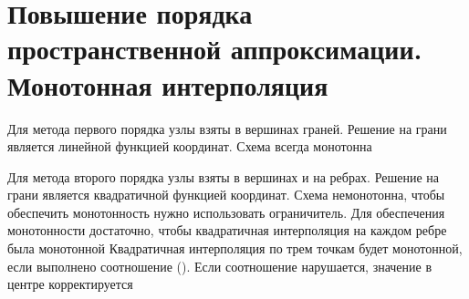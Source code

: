 \section{Повышение порядка пространственной аппроксимации. Монотонная интерполяция}
Для метода первого порядка узлы взяты в вершинах граней. Решение на грани является линейной функцией координат. Схема всегда монотонна

Для метода второго порядка узлы взяты в вершинах и на ребрах. Решение на грани является квадратичной функцией координат. Схема немонотонна, чтобы обеспечить монотонность нужно использовать ограничитель. Для обеспечения монотонности достаточно, чтобы квадратичная интерполяция на каждом ребре была монотонной Квадратичная интерполяция по трем точкам будет монотонной, если выполнено соотношение (). Если соотношение нарушается, значение в центре корректируется